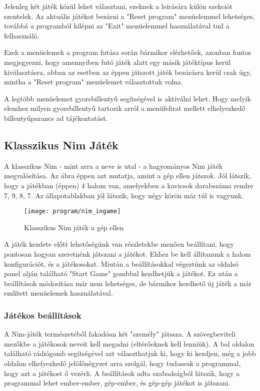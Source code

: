 Jelenleg két játék közül lehet választani, ezeknek a leírására külön szekciót szentelek. Az aktuális játékot bezárni a "Reset program" menüelemmel lehetséges, továbbá a programból kilépni az "Exit" menüelemmel használatával tud a felhasználó.\ujsor

Ezek a menüelemek a program futása során bármikor elérhetőek, azonban fontos megjegyezni, hogy amennyiben futó játék alatt egy másik játéktípus kerül kiválasztásra, abban az esetben az éppen játszott játék bezárásra kerül csak úgy, mintha a "Reset program" menüelemet választottuk volna.\ujsor

A legtöbb menüelemet gyorsbillentyű segítségével is aktiválni lehet. Hogy melyik elemhez milyen gyorsbillentyű tartozik arról a menüfelirat mellett elhelyezkedő billentyűparancs ad tájékoztatást.

\subsection{Klasszikus Nim Játék}
A klasszikus Nim - mint arra a neve is utal - a hagyományos Nim játék megvalósítása. Az  ábra éppen azt mutatja, amint a gép ellen játszok. Jól látszik, hogy a játékban (éppen) 4 halom van, amelyekben a kavicsok darabszáma rendre 7, 9, 8, 7. Az állapotablakban jól látszik, hogy négy körön már túl is vagyunk.
\begin{figure}[h]
	\texttt{[image: program/nim\_ingame]}
	\centering
	\caption{Klasszikus Nim játék a gép ellen}
	\label{fig:nim_ingame}
\end{figure}

A játék kezdete előtt lehetőségünk van részletekbe menően beállítani, hogy pontosan hogyan szeretnénk játszani a játékot. Ehhez be kell állítanunk a halom konfigurációt, és a játékosokat. Miután a beállításokkal végeztünk az oldalsó panel alján található "Start Game" gombbal kezdhetjük a játékot. Ez után a beállítások módosítása már nem lehetséges, de bármikor kezdhető új játék a már említett menüelemek használatával.

\subsubsection{Játékos beállítások} \label{section:nim_playersettings}
A Nim-játék természetéből fakadóan két "személy" játssza. A szövegbeviteli mezőkbe a játékosok neveit kell megadni (eltérőeknek kell lenniük). A bal oldalon található rádiógomb segítségével azt választhatjuk ki, hogy ki kezdjen, még a jobb oldalon elhelyezkedő jelölőnégyzet arra szolgál, hogy tudassuk a programmal, hogy azt a játékost ő vezérli.\ujsor
A beállítások adta szabadságból látszik, hogy a programmal lehet ember-ember, gép-ember, és gép-gép játékot is játszani.

